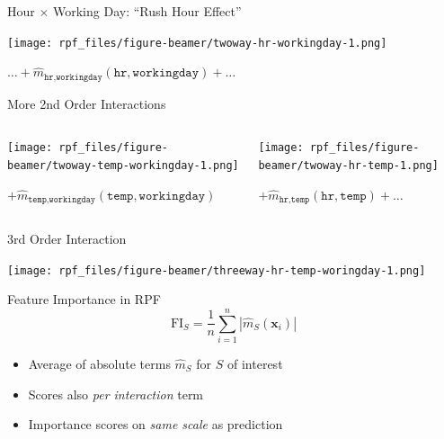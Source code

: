 \documentclass[aspectratio=169,12pt]{beamer}
\providecommand{\tightlist}{%
  \setlength{\itemsep}{2pt}\setlength{\parskip}{0pt}}
\begin{document}
\begin{frame}{Hour \(\times\) Working Day: ``Rush Hour Effect''}
\label{hour-times-working-day-rush-hour-effect}
\begin{center}
\texttt{[image: rpf\_files/figure-beamer/twoway-hr-workingday-1.png]}
\end{center}

\begin{center}

$\ldots + \hat{m}_{\texttt{hr}, \texttt{workingday}}(\texttt{hr}, \texttt{workingday}) + \ldots$

\end{center}
\end{frame}

\begin{frame}{More 2nd Order Interactions}
\label{more-2nd-order-interactions}
\begin{columns}[T]
\begin{column}[c]{0.5\linewidth}
\begin{center}
\texttt{[image: rpf\_files/figure-beamer/twoway-temp-workingday-1.png]}
\end{center}

\(+ \hat{m}_{\texttt{temp}, \texttt{workingday}}(\texttt{temp}, \texttt{workingday})\)
\end{column}

\pause

\begin{column}[c]{0.5\linewidth}
\begin{center}
\texttt{[image: rpf\_files/figure-beamer/twoway-hr-temp-1.png]}
\end{center}

\(+ \hat{m}_{\texttt{hr}, \texttt{temp}}(\texttt{hr}, \texttt{temp}) + \ldots\)
\end{column}
\end{columns}
\end{frame}

\begin{frame}{3rd Order Interaction}
\label{rd-order-interaction}
\begin{center}
\texttt{[image: rpf\_files/figure-beamer/threeway-hr-temp-woringday-1.png]}
\end{center}
\end{frame}

\begin{frame}{Feature Importance in RPF}
\label{feature-importance-in-rpf}
\[\mathrm{FI}_S = \frac{1}{n} \sum_{i=1}^n |\hat{m}_S(\mathbf{x}_i)|\]

\begin{itemize}[<+->]
\tightlist
\item
  Average of absolute terms \(\hat{m}_S\) for \(S\) of interest
\item
  Scores also \emph{per interaction} term
\item
  Importance scores on \emph{same scale} as prediction
\end{itemize}
\end{frame}
\end{document}
